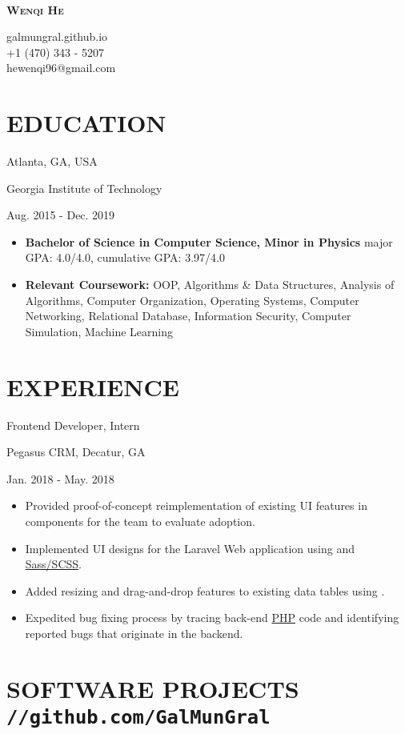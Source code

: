 \documentclass[11pt]{article}
\newcommand{\centertitle}[3]{
	{\noindent\bfseries
	\parbox[][0.5em][b]{0.35\textwidth}{#1\hfill}%
	\parbox[][0.5em][b]{0.3\textwidth}{\centerline{#2}}%
	\parbox[][0.5em][b]{0.35\textwidth}{\hfill#3}}
}
\begin{document}
\noindent
\parbox{0.2\textwidth}{\,}
\parbox{0.6\textwidth}{\centerline{\huge\scshape\bfseries Wenqi He}}
\parbox{0.2\textwidth}{galmungral.github.io\\+1 (470) 343 - 5207 \\hewenqi96@gmail.com}

\section*{EDUCATION}
\centertitle{Atlanta, GA, USA}{Georgia Institute of Technology}{Aug. 2015 - Dec. 2019}
\begin{itemize}[leftmargin=15pt, noitemsep, topsep=0pt]
\item \textbf{Bachelor of Science in Computer Science, Minor in Physics} \hfill major GPA: 4.0/4.0, cumulative GPA: 3.97/4.0
\item \textbf{Relevant Coursework:} OOP, Algorithms \& Data Structures, Analysis of Algorithms, Computer Organization, Operating Systems, Computer Networking, Relational Database, Information Security, Computer Simulation, Machine Learning
\end{itemize}
\vspace{-0.5em}

\section*{EXPERIENCE}
\centertitle{Frontend Developer, Intern}{Pegasus CRM, Decatur, GA}{Jan. 2018 - May. 2018}
\begin{itemize}[leftmargin=15pt, noitemsep, topsep=0pt]
\item Provided proof-of-concept reimplementation of existing UI features in \underline{} components for the team to evaluate adoption.
\item Implemented UI designs for the Laravel Web application using \underline{} and \underline{Sass/SCSS}. 
\item Added resizing and drag-and-drop features to existing data tables using \underline{}.
\item Expedited bug fixing process by tracing back-end \underline{PHP} code and identifying reported bugs that originate in the backend.
\end{itemize}
\vspace{-0.5em}

\section*{SOFTWARE PROJECTS \hfill \normalsize\texttt{//github.com/GalMunGral}}
\end{document}
